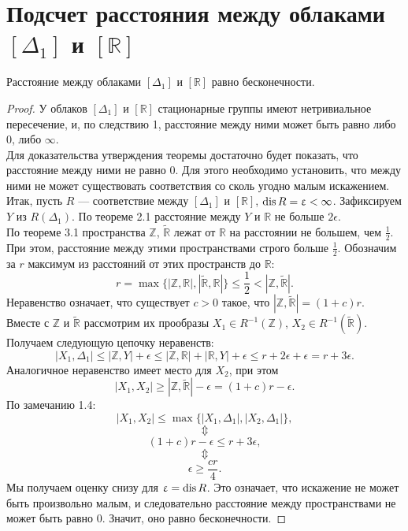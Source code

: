 
\section{Подсчет расстояния между облаками $[\Delta_1]$ и $[\mathbb{R}]$}
\begin{theorem} Расстояние между облаками $[\Delta_1]$ и $[\mathbb{R}]$ равно
бесконечности.
\end{theorem} 
\begin{proof} У облаков $[\Delta_1]$ и $[\mathbb{R}]$ стационарные группы имеют
нетривиальное пересечение, и, по следствию 1, расстояние между ними может быть
равно либо $0$, либо $\infty$. \\ Для доказательства утверждения теоремы
достаточно будет показать, что расстояние между ними не равно $0$.  Для этого
необходимо установить, что между ними не может существовать соответствия со
сколь угодно малым искажением. Итак, пусть $R$ --- соответствие между
$[\Delta_1]$ и $[\mathbb{R}]$, $\operatorname{dis} R = \upvarepsilon < \infty$.
Зафиксируем $Y$ из $R(\Delta_1)$. По теореме 2.1 расстояние между $Y$ и $\mathbb{R}$ не больше $2\epsilon$.\\  По теореме 3.1 пространства $\mathbb{Z}$, $\widetilde{\mathbb{R}}$ лежат от $\mathbb{R}$ на расстоянии не большем, чем $\frac{1}{2}$. При этом,
расстояние между этими пространствами строго больше $\frac{1}{2}$. Обозначим за
$r$ максимум из расстояний от этих пространств до $\mathbb{R}$:
	$$r = \max\big\{|\mathbb{Z}, \mathbb{R}|,|\widetilde{\mathbb{R}}, \mathbb{R}|\big\}\le \frac{1}{2} < |\mathbb{Z}, \widetilde{\mathbb{R}}|.$$
	Неравенство означает, что существует $c > 0$ такое, что
$|\mathbb{Z}, \widetilde{\mathbb{R}}| = (1 + c)r.$ \\ Вместе с $\mathbb{Z}$ и
$ \widetilde{\mathbb{R}}$ рассмотрим их прообразы $X_1 \in R^{-1}(\mathbb{Z})$,
$ X_2 \in R^{-1}(\widetilde{\mathbb{R}})$.  \\ Получаем следующую цепочку
неравенств:
	$$|X_1, \Delta_1| \le |\mathbb{Z}, Y| + \epsilon \le |\mathbb{Z}, \mathbb{R}| + |\mathbb{R}, Y| +\epsilon \le r + 2\epsilon + \epsilon = r + 3\epsilon.$$
	Аналогичное неравенство имеет место для $X_2$, при этом
	$$|X_1, X_2|  \ge |\mathbb{Z}, \widetilde{\mathbb{R}}| - \epsilon = (1+c)r - \epsilon.$$
	По замечанию 1.4:
	$$|X_1, X_2| \le \max\big\{ |X_1, \Delta_1|, |X_2, \Delta_1| \big\},$$
	$$\Updownarrow$$
	$$(1+c)r - \epsilon\le r + 3\epsilon,$$
	$$\Updownarrow$$
	$$\epsilon \ge \frac{cr}{4}.$$
	Мы получаем оценку снизу для $\upvarepsilon = \operatorname{dis} R$. Это означает, что
искажение не может быть произвольно малым, и следовательно расстояние между
пространствами не может быть равно 0. Значит, оно равно бесконечности.
	
\end{proof}
